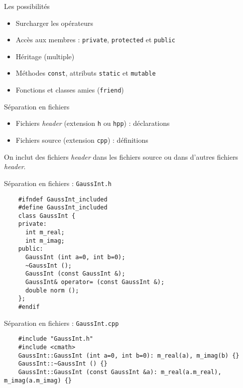\begin{frame}{Les possibilités}
  \begin{itemize}
  \item Surcharger les opérateurs
  \item Accès aux membres : \texttt{private}, \texttt{protected} et \texttt{public}
  \item Héritage (multiple)
  \item Méthodes \texttt{const}, attributs \texttt{static} et \texttt{mutable}
  \item Fonctions et classes amies (\texttt{friend})
  \end{itemize}
\end{frame}

\begin{frame}{Séparation en fichiers}
  \begin{itemize}
  \item Fichiers \textit{header} (extension \texttt{h} ou \texttt{hpp}) : déclarations
  \item Fichiers source (extension \texttt{cpp}) : définitions
  \end{itemize}

  On inclut des fichiers \textit{header} dans les fichiers source ou dans d'autres fichiers \textit{header}.
\end{frame}

\begin{frame}[fragile]{Séparation en fichiers : \texttt{GaussInt.h}}
  \begin{lstlisting}
    #ifndef GaussInt_included
    #define GaussInt_included
    class GaussInt {
    private:
      int m_real;
      int m_imag;
    public:
      GaussInt (int a=0, int b=0);
      ~GaussInt ();
      GaussInt (const GaussInt &);
      GaussInt& operator= (const GaussInt &);
      double norm ();
    };
    #endif
  \end{lstlisting}
\end{frame}

\begin{frame}[fragile]{Séparation en fichiers : \texttt{GaussInt.cpp}}
  \begin{lstlisting}
    #include "GaussInt.h"
    #include <cmath>
    GaussInt::GaussInt (int a=0, int b=0): m_real(a), m_imag(b) {}
    GaussInt::~GaussInt () {}
    GaussInt::GaussInt (const GaussInt &a): m_real(a.m_real), m_imag(a.m_imag) {}
  \end{lstlisting}
\end{frame}

